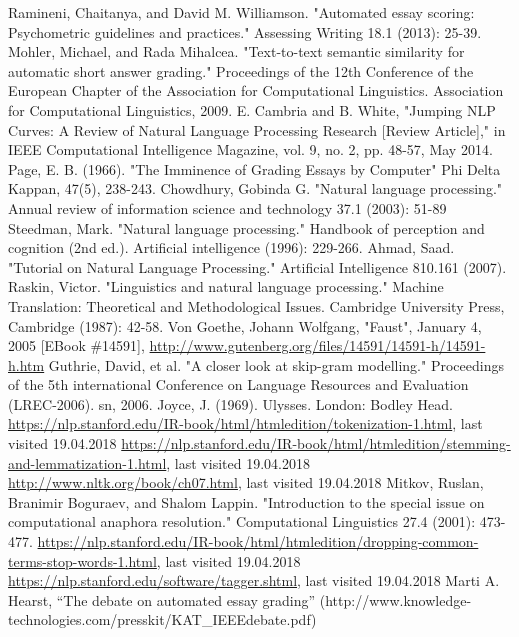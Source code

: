\documentclass[rnd]{mas_report}
\begin{document}
\begin{thebibliography}{3}
 Ramineni, Chaitanya, and David M. Williamson. "Automated essay scoring: Psychometric guidelines and practices." Assessing Writing 18.1 (2013): 25-39. 
 Mohler, Michael, and Rada Mihalcea. "Text-to-text semantic similarity for automatic short answer grading." Proceedings of the 12th Conference of the European Chapter of the Association for Computational Linguistics. Association for Computational Linguistics, 2009.
 E. Cambria and B. White, "Jumping NLP Curves: A Review of Natural Language Processing Research [Review Article]," in IEEE Computational Intelligence Magazine, vol. 9, no. 2, pp. 48-57, May 2014.
  Page, E. B. (1966). "The Imminence of Grading Essays by Computer" Phi Delta Kappan, 47(5), 238-243.
 Chowdhury, Gobinda G. "Natural language processing." Annual review of information science and technology 37.1 (2003): 51-89
 Steedman, Mark. "Natural language processing." Handbook of perception and cognition (2nd ed.). Artificial intelligence (1996): 229-266.
 Ahmad, Saad. "Tutorial on Natural Language Processing." Artificial Intelligence 810.161 (2007).
  Raskin, Victor. "Linguistics and natural language processing." Machine Translation: Theoretical and Methodological Issues. Cambridge University Press, Cambridge (1987): 42-58.
 Von Goethe, Johann Wolfgang, "Faust", January 4, 2005 [EBook \#14591], \url{http://www.gutenberg.org/files/14591/14591-h/14591-h.htm}
 Guthrie, David, et al. "A closer look at skip-gram modelling." Proceedings of the 5th international Conference on Language Resources and Evaluation (LREC-2006). sn, 2006.
 Joyce, J. (1969). Ulysses. London: Bodley Head.
 \url{https://nlp.stanford.edu/IR-book/html/htmledition/tokenization-1.html}, last visited 19.04.2018
 \url{https://nlp.stanford.edu/IR-book/html/htmledition/stemming-and-lemmatization-1.html}, last visited 19.04.2018
 \url{http://www.nltk.org/book/ch07.html}, last visited 19.04.2018
 Mitkov, Ruslan, Branimir Boguraev, and Shalom Lappin. "Introduction to the special issue on computational anaphora resolution." Computational Linguistics 27.4 (2001): 473-477.
 \url{https://nlp.stanford.edu/IR-book/html/htmledition/dropping-common-terms-stop-words-1.html}, last visited 19.04.2018
 \url{https://nlp.stanford.edu/software/tagger.shtml}, last visited 19.04.2018
 Marti A. Hearst, ``The debate on automated essay grading'' (http://www.knowledge-technologies.com/presskit/KAT\_IEEEdebate.pdf) 

\end{thebibliography}
\end{document}
